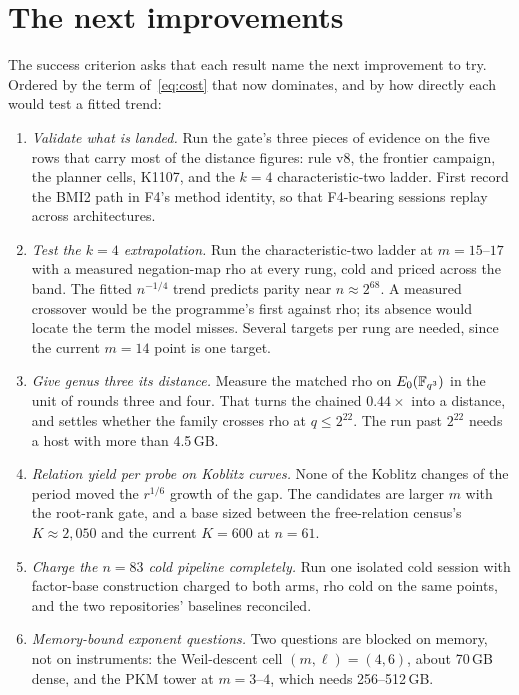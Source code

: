\section{The next improvements}\label{sec:next}

The success criterion asks that each result name the next improvement to
try. Ordered by the term of~\eqref{eq:cost} that now dominates, and by how
directly each would test a fitted trend:

\begin{enumerate}
\item \emph{Validate what is landed.} Run the gate's three pieces of
  evidence on the five rows that carry most of the distance figures: rule
  v8, the frontier campaign, the planner cells, K1107, and the $k=4$
  characteristic-two ladder. First record the BMI2 path in F4's method
  identity, so that F4-bearing sessions replay across architectures.
\item \emph{Test the $k=4$ extrapolation.} Run the characteristic-two ladder
  at $m=15$--$17$ with a measured negation-map rho at every rung, cold and
  priced across the band. The fitted $n^{-1/4}$ trend predicts parity near
  $n\approx2^{68}$. A measured crossover would be the programme's first
   against rho; its absence would locate the term the model
  misses. Several targets per rung are needed, since the current
  $m=14$ point is one target.
\item \emph{Give genus three its distance.} Measure the matched rho on
  $E_0(\mathbb{F}_{q^3})$ in the unit of rounds three and four. That turns the
  chained $0.44\times$ into a distance, and settles whether the family
  crosses rho at $q\le2^{22}$. The run past $2^{22}$ needs a host with more
  than 4.5\,GB.
\item \emph{Relation yield per probe on Koblitz curves.} None of the
  Koblitz changes of the period moved the $r^{1/6}$ growth of the gap. The
  candidates are larger $m$ with the root-rank gate, and a base sized
  between the free-relation census's $K\approx2{,}050$ and the current
  $K=600$ at $n=61$.
\item \emph{Charge the $n=83$ cold pipeline completely.} Run one isolated
  cold session with factor-base construction charged to both arms, rho
  cold on the same points, and the two repositories' baselines reconciled.
\item \emph{Memory-bound exponent questions.} Two questions are blocked on
  memory, not on instruments: the Weil-descent cell $(m,\ell)=(4,6)$, about
  70\,GB dense, and the PKM tower at $m=3$--$4$, which needs 256--512\,GB.
\end{enumerate}
